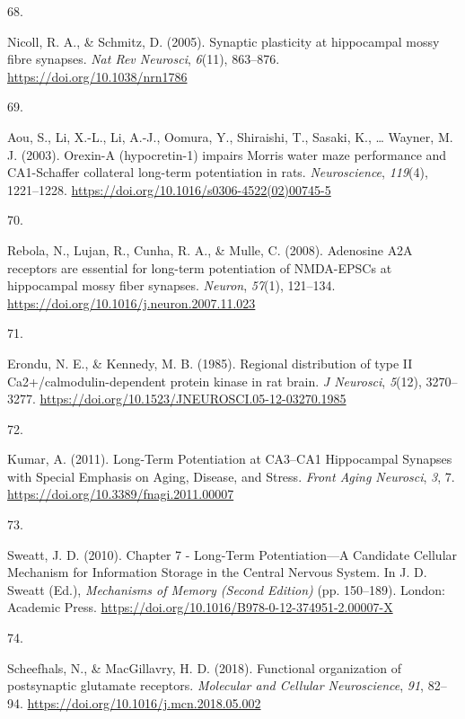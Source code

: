 \documentclass[
  11pt,
  letterpaper,
]{scrreprt}
\newlength{\cslhangindent}
\newlength{\csllabelwidth}
\newenvironment{CSLReferences}[2] %
 {\begin{list}{}{%
  \setlength{\itemindent}{0pt}
  \setlength{\leftmargin}{0pt}
  \setlength{\parsep}{0pt}
  \ifodd #1
   \setlength{\leftmargin}{\cslhangindent}
   \setlength{\itemindent}{-1\cslhangindent}
  \fi
  \setlength{\itemsep}{#2\baselineskip}}}
 {\end{list}}
\newcommand{\CSLLeftMargin}[1]{\parbox[t]{\csllabelwidth}{\strut#1\strut}}
\newcommand{\CSLRightInline}[1]{\parbox[t]{\linewidth - \csllabelwidth}{\strut#1\strut}}
\begin{document}
\begin{CSLReferences}{0}{0}
\CSLLeftMargin{68. }%
\CSLRightInline{Nicoll, R. A., \& Schmitz, D. (2005). Synaptic
plasticity at hippocampal mossy fibre synapses. \emph{Nat Rev Neurosci},
\emph{6}(11), 863--876. \url{https://doi.org/10.1038/nrn1786}}

\CSLLeftMargin{69. }%
\CSLRightInline{Aou, S., Li, X.-L., Li, A.-J., Oomura, Y., Shiraishi,
T., Sasaki, K., \ldots{} Wayner, M. J. (2003). Orexin-{A} (hypocretin-1)
impairs {Morris} water maze performance and {CA1-Schaffer} collateral
long-term potentiation in rats. \emph{Neuroscience}, \emph{119}(4),
1221--1228. \url{https://doi.org/10.1016/s0306-4522(02)00745-5}}

\CSLLeftMargin{70. }%
\CSLRightInline{Rebola, N., Lujan, R., Cunha, R. A., \& Mulle, C.
(2008). Adenosine {A2A} receptors are essential for long-term
potentiation of {NMDA-EPSCs} at hippocampal mossy fiber synapses.
\emph{Neuron}, \emph{57}(1), 121--134.
\url{https://doi.org/10.1016/j.neuron.2007.11.023}}

\CSLLeftMargin{71. }%
\CSLRightInline{Erondu, N. E., \& Kennedy, M. B. (1985). Regional
distribution of type {II Ca2}+/calmodulin-dependent protein kinase in
rat brain. \emph{J Neurosci}, \emph{5}(12), 3270--3277.
\url{https://doi.org/10.1523/JNEUROSCI.05-12-03270.1985}}

\CSLLeftMargin{72. }%
\CSLRightInline{Kumar, A. (2011). Long-{Term Potentiation} at
{CA3}--{CA1 Hippocampal Synapses} with {Special Emphasis} on {Aging},
{Disease}, and {Stress}. \emph{Front Aging Neurosci}, \emph{3}, 7.
\url{https://doi.org/10.3389/fnagi.2011.00007}}

\CSLLeftMargin{73. }%
\CSLRightInline{Sweatt, J. D. (2010). Chapter 7 - {Long-Term
Potentiation}---{A Candidate Cellular Mechanism} for {Information
Storage} in the {Central Nervous System}. In J. D. Sweatt (Ed.),
\emph{Mechanisms of {Memory} ({Second Edition})} (pp. 150--189). London:
Academic Press.
\url{https://doi.org/10.1016/B978-0-12-374951-2.00007-X}}

\CSLLeftMargin{74. }%
\CSLRightInline{Scheefhals, N., \& MacGillavry, H. D. (2018). Functional
organization of postsynaptic glutamate receptors. \emph{Molecular and
Cellular Neuroscience}, \emph{91}, 82--94.
\url{https://doi.org/10.1016/j.mcn.2018.05.002}}


\end{CSLReferences}
\end{document}
